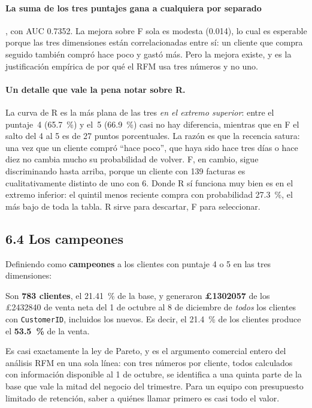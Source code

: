 \documentclass[11pt]{article}
\newcommand{\gbp}{\pounds}
\begin{document}


\paragraph{La suma de los tres puntajes gana a cualquiera por separado},
con AUC \num{0.7352}. La mejora sobre F sola es modesta (\num{0.014}), lo
cual es esperable porque las tres dimensiones est\'an correlacionadas entre
s\'i: un cliente que compra seguido tambi\'en compr\'o hace poco y gast\'o
m\'as. Pero la mejora existe, y es la justificaci\'on emp\'irica de por qu\'e
el RFM usa tres n\'umeros y no uno.

\paragraph{Un detalle que vale la pena notar sobre R.} La curva de R es la
m\'as plana de las tres \emph{en el extremo superior}: entre el puntaje~4
(\SI{65.7}{\percent}) y el~5 (\SI{66.9}{\percent}) casi no hay diferencia,
mientras que en F el salto del 4 al 5 es de \num{27} puntos porcentuales. La
raz\'on es que la recencia satura: una vez que un cliente compr\'o
``hace poco'', que haya sido hace tres d\'ias o hace diez no cambia mucho su
probabilidad de volver. F, en cambio, sigue discriminando hasta arriba,
porque un cliente con \num{139} facturas es cualitativamente distinto de uno
con \num{6}. Donde R s\'i funciona muy bien es en el extremo inferior: el
quintil menos reciente compra con probabilidad \SI{27.3}{\percent}, el m\'as
bajo de toda la tabla. R sirve para descartar, F para seleccionar.

\subsection{6.4 Los campeones}

Definiendo como \textbf{campeones} a los clientes con puntaje 4 o 5 en las
tres dimensiones:



Son \textbf{\num{783} clientes}, el \SI{21.41}{\percent} de la base, y
generaron \textbf{\gbp\num{1302057}} de los \gbp\num{2432840} de venta neta
del 1 de octubre al 8 de diciembre de \emph{todos} los clientes con
\texttt{CustomerID}, incluidos los nuevos. Es decir, el
\SI{21.4}{\percent} de los clientes produce el \textbf{\SI{53.5}{\percent}}
de la venta.

Es casi exactamente la ley de Pareto, y es el argumento comercial entero del
an\'alisis RFM en una sola l\'inea: con tres n\'umeros por cliente, todos
calculados con informaci\'on disponible al 1 de octubre, se identifica a una
quinta parte de la base que vale la mitad del negocio del trimestre. Para un
equipo con presupuesto limitado de retenci\'on, saber a qui\'enes llamar
primero es casi todo el valor.
\end{document}
